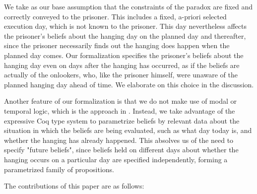 \documentclass[runningheads]{llncs}
\begin{document}
We take as our base assumption that the constraints of the paradox are
fixed and correctly conveyed to the prisoner. This includes a fixed, a-priori selected execution day, which is not known to the prisoner. This day nevertheless
affects the prisoner's beliefs about the hanging day on the planned day and thereafter,
since the prisoner necessarily finds out the hanging does happen when the planned
day comes. Our formalization specifies
the prisoner's beliefs about the hanging day even on days after the hanging has occurred,
as if the beliefs are actually of the onlookers, who, like the prisoner himself, were unaware
of the planned hanging day ahead of time. We elaborate on this choice in the discussion.

Another feature of our formalization is that we do not make use of modal or temporal logic,
which is the approach in \cite{modalepistemic}.
Instead, we take advantage of the expressive Coq type system to
parametrize beliefs by relevant data about the situation in which the beliefs are
being evaluated, such as what day today is, and whether the hanging has already happened.
This absolves us of the need to specify "future beliefs", since beliefs held on different
days about whether the hanging occurs on a particular day are specified
independently, forming a parametrized family of propositions.

  The contributions of this paper are as follows:
\end{document}
